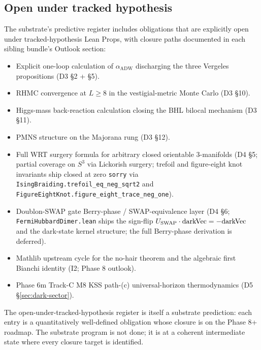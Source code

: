 \documentclass[aps,prd,reprint,nofootinbib,superscriptaddress]{revtex4-2}
\begin{document}
\subsection{Open under tracked hypothesis}

The substrate's predictive register includes obligations that are
explicitly open under tracked-hypothesis Lean Props, with closure paths
documented in each sibling bundle's Outlook section:

\begin{itemize}\setlength{\itemsep}{0pt}
\item Explicit one-loop calculation of $\alpha_{\mathrm{ADW}}$
  discharging the three Vergeles propositions (D3 \S 2 + \S 5).
\item RHMC convergence at $L \geq 8$ in the vestigial-metric Monte
  Carlo (D3 \S 10).
\item Higgs-mass back-reaction calculation
  closing the BHL bilocal mechanism (D3 \S 11).
\item PMNS structure on the Majorana rung (D3 \S 12).
\item Full WRT surgery formula for arbitrary closed orientable
  3-manifolds (D4 \S 5; partial coverage on $S^3$ via Lickorish
  surgery; trefoil and figure-eight knot invariants ship closed at
  zero \texttt{sorry} via
  \texttt{IsingBraiding.trefoil\_eq\_neg\_sqrt2} and
  \texttt{FigureEightKnot.figure\_eight\_trace\_neg\_one}).
\item Doublon-SWAP gate Berry-phase / SWAP-equivalence layer
  (D4 \S 6; \texttt{FermiHubbardDimer.lean} ships the sign-flip
  $U_{\rm SWAP}\cdot\mathrm{darkVec} = -\mathrm{darkVec}$ and the
  dark-state kernel structure; the full Berry-phase derivation is
  deferred).
\item Mathlib upstream cycle for the no-hair theorem and the
  algebraic first Bianchi identity (I2; Phase 8 outlook).
\item Phase 6m Track-C M8 KSS path-(c) universal-horizon
  thermodynamics (D5 \S\ref{sec:dark-sector}).
\end{itemize}

The open-under-tracked-hypothesis register is itself a substrate
prediction: each entry is a quantitatively well-defined obligation
whose closure is on the Phase 8+ roadmap. The substrate program is
not done; it is at a coherent intermediate state where every closure
target is identified.

\end{document}
